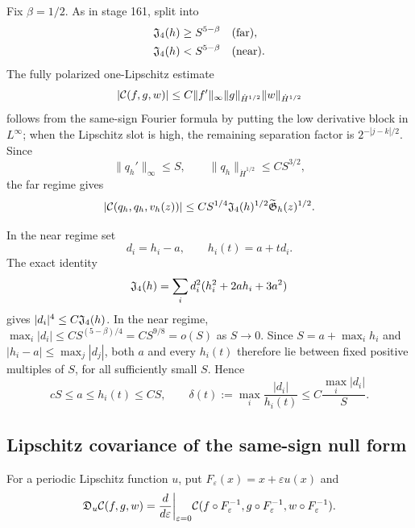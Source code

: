 Fix $\beta=1/2$.  As in stage 161, split into
\begin{align}
 \mathfrak J_4(h)&\ge S^{5-\beta}&&\text{(far)},\label{PT:eq:far-regime}\\
 \mathfrak J_4(h)&<S^{5-\beta}&&\text{(near)}.\label{PT:eq:near-regime}
\end{align}
The fully polarized one-Lipschitz estimate
\begin{equation}\label{PT:eq:one-slot}
 |\mathcal C(f,g,w)|
 \le C\|f'\|_\infty
       \|g\|_{\dot H^{1/2}}\|w\|_{\dot H^{1/2}}
\end{equation}
follows from the same-sign Fourier formula by putting the low derivative
block in $L^\infty$; when the Lipschitz slot is high, the remaining
separation factor is $2^{-|j-k|/2}$.  Since
\begin{equation}\label{PT:eq:q-size}
 \|q_h'\|_\infty\le S,
 \qquad \|q_h\|_{\dot H^{1/2}}\le CS^{3/2},
\end{equation}
the far regime gives
\begin{equation}\label{PT:eq:far-bound}
 |\mathcal C(q_h,q_h,v_h(z))|
 \le CS^{1/4}\mathfrak J_4(h)^{1/2}\widetilde{\mathfrak G}_h(z)^{1/2}.
\end{equation}

In the near regime set
\begin{equation}\label{PT:eq:path}
 d_i=h_i-a,\qquad h_i(t)=a+td_i.
\end{equation}
The exact identity
\begin{equation}\label{PT:eq:Jidentity}
 \mathfrak J_4(h)=\sum_i d_i^2(h_i^2+2ah_i+3a^2)
\end{equation}
gives $|d_i|^4\le C\mathfrak J_4(h)$.  In the near regime,
$\max_i|d_i|\le CS^{(5-\beta)/4}=CS^{9/8}=o(S)$ as $S\to0$.
Since $S=a+\max_i h_i$ and $|h_i-a|\le\max_j|d_j|$, both $a$ and every
$h_i(t)$ therefore lie between fixed positive multiples of $S$, for all
sufficiently small $S$.  Hence
\begin{equation}\label{PT:eq:comparable}
 cS\le a\le h_i(t)\le CS,
 \qquad
 \delta(t):=\max_i\frac{|d_i|}{h_i(t)}
 \le C\frac{\max_i|d_i|}{S}.
\end{equation}

\subsection{Lipschitz covariance of the same-sign null form}

For a periodic Lipschitz function $u$, put
$F_\varepsilon(x)=x+\varepsilon u(x)$ and
\begin{equation}\label{PT:eq:transport-derivative}
 \mathfrak D_u\mathcal C(f,g,w)
 =\frac d{d\varepsilon}\bigg|_{\varepsilon=0}
 \mathcal C(f\circ F_\varepsilon^{-1},
        g\circ F_\varepsilon^{-1},
        w\circ F_\varepsilon^{-1}).
\end{equation}

